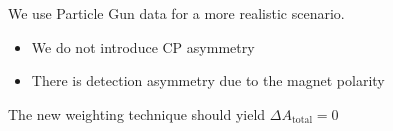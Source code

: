 \documentclass{beamer}
\begin{document}
\begin{frame}
      \frametitle{\insertsubsectionhead}
      \rightarrow We use Particle Gun data for a more realistic scenario.
      \begin{itemize}
            \item We do not introduce CP asymmetry
            \item There is detection asymmetry due to the magnet polarity
      \end{itemize}
      \begin{figure}
            \centering
      \end{figure}
      \rightarrow The new weighting technique should yield $\Delta A_\text{total} = 0$
\end{frame}
\end{document}

